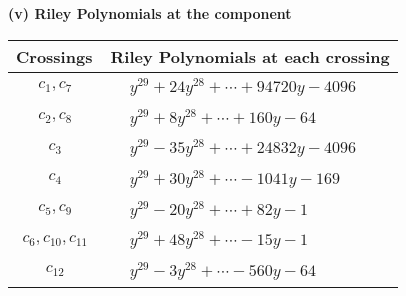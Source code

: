 \documentclass[1p]{elsarticle_modified}
\theoremstyle{definition}
\begin{document}
\flushleft \textbf{(v) Riley Polynomials at the component}\newline \\
\begin{tabular}{m{50pt}|m{274pt}}
Crossings & \hspace{64pt}Riley Polynomials at each crossing \\
\hline $$\begin{aligned}c_{1},c_{7}\end{aligned}$$&$\begin{aligned}
&y^{29}+24 y^{28}+\cdots+94720 y-4096
\end{aligned}$\\
\hline $$\begin{aligned}c_{2},c_{8}\end{aligned}$$&$\begin{aligned}
&y^{29}+8 y^{28}+\cdots+160 y-64
\end{aligned}$\\
\hline $$\begin{aligned}c_{3}\end{aligned}$$&$\begin{aligned}
&y^{29}-35 y^{28}+\cdots+24832 y-4096
\end{aligned}$\\
\hline $$\begin{aligned}c_{4}\end{aligned}$$&$\begin{aligned}
&y^{29}+30 y^{28}+\cdots-1041 y-169
\end{aligned}$\\
\hline $$\begin{aligned}c_{5},c_{9}\end{aligned}$$&$\begin{aligned}
&y^{29}-20 y^{28}+\cdots+82 y-1
\end{aligned}$\\
\hline $$\begin{aligned}c_{6},c_{10},c_{11}\end{aligned}$$&$\begin{aligned}
&y^{29}+48 y^{28}+\cdots-15 y-1
\end{aligned}$\\
\hline $$\begin{aligned}c_{12}\end{aligned}$$&$\begin{aligned}
&y^{29}-3 y^{28}+\cdots-560 y-64
\end{aligned}$\\
\hline
\end{tabular}\\~\\
\end{document}
